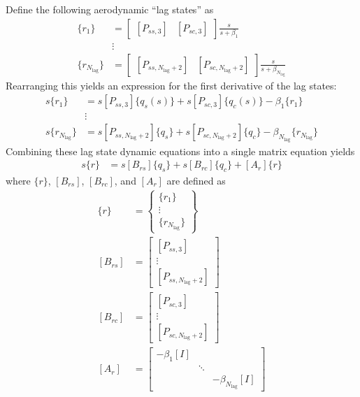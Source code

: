 Define the following aerodynamic ``lag states'' as
\begin{equation}
\begin{aligned}
	\{r_1\} &= \begin{bmatrix} [P_{ss,3}] & [P_{sc,3}] \end{bmatrix} \frac{s}{s+\beta_1} \\
	&\vdots \\
	\{r_{N_\text{lag}}\} &= \begin{bmatrix} [P_{ss,N_\text{lag}+2}] & [P_{sc,N_\text{lag}+2}] \end{bmatrix} \frac{s}{s+\beta_{N_\text{lag}}}
\end{aligned}
\end{equation}
Rearranging this yields an expression for the first derivative of the lag states:
\begin{equation}
\begin{aligned}
	s \{r_1\} &= s [P_{ss,3}] \{q_s(s)\} + s [P_{sc,3}] \{q_c(s)\} - \beta_1 \{r_1\} \\
	&\vdots \\
	s \{r_{N_\text{lag}}\} &= s [P_{ss,N_\text{lag}+2}] \{q_s\} + s [P_{sc,N_\text{lag}+2}] \{q_c\} - \beta_{N_\text{lag}} \{r_{N_\text{lag}}\}
\end{aligned}
\end{equation}
Combining these lag state dynamic equations into a single matrix equation yields
\begin{align}
	\label{eq:lagDynamics}
	s\{r\} &= s [B_{rs}] \{q_s\} + s [B_{rc}] \{q_c\} + [A_r] \{r\}
\end{align}
where $\{r\}$, $[B_{rs}]$, $[B_{rc}]$, and $[A_r]$ are defined as
\begin{equation}
\begin{aligned}
	\{r\} &= \begin{Bmatrix} \{r_1\} \\ \vdots \\ \{r_{N_\text{lag}}\} \end{Bmatrix} \\
	[B_{rs}] &= \begin{bmatrix} [P_{ss,3}] \\ \vdots \\ [P_{ss,N_\text{lag}+2}] \end{bmatrix} \\
	[B_{rc}] &= \begin{bmatrix} [P_{sc,3}] \\ \vdots \\ [P_{sc,N_\text{lag}+2}] \end{bmatrix}	\\
	[A_r] &= \begin{bmatrix}
	-\beta_1 [I] & & \\
	& \ddots & \\
	& & -\beta_{N_\text{lag}} [I]
	\end{bmatrix}
\end{aligned}
\end{equation}

